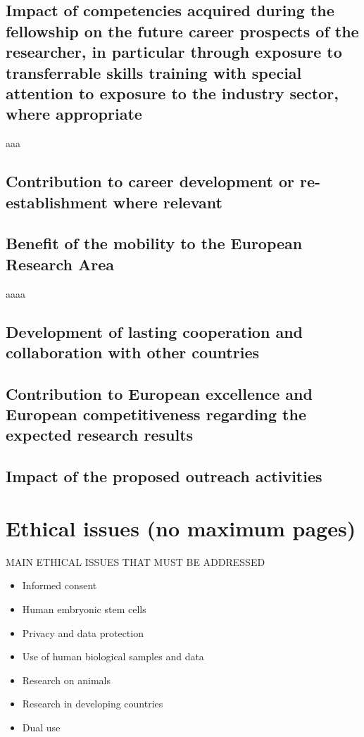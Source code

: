 \documentclass[a4paper,11pt]{article}
\begin{document}
\subsection{Impact of competencies acquired during the fellowship on the future career prospects of the researcher, in particular through exposure to transferrable skills training with special attention to exposure to the industry sector, where appropriate}
aaa
\subsection{Contribution to career development or re-establishment where relevant}

\subsection{Benefit of the mobility to the European Research Area}
aaaa
\subsection{Development of lasting cooperation and collaboration with other countries}

\subsection{Contribution to European excellence and European competitiveness regarding the expected research results}

\subsection{Impact of the proposed outreach activities}



\section{Ethical issues  (no maximum pages)}

MAIN ETHICAL ISSUES THAT MUST BE ADDRESSED
\begin{itemize}
\item Informed consent
\item Human embryonic stem cells
\item Privacy and data protection
\item Use of human biological samples and data
\item Research on animals
\item Research in developing countries
\item Dual use
\end{itemize}
\end{document}
